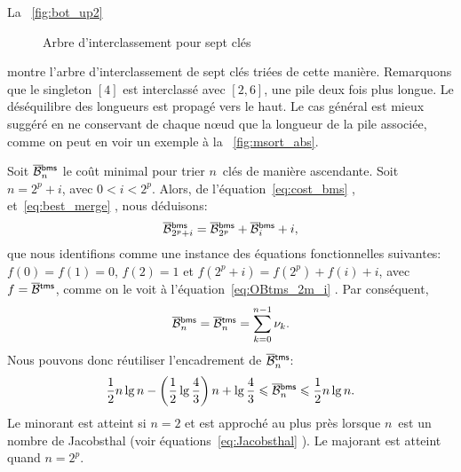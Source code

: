 La \fig~\vref{fig:bot_up2}
\begin{figure}[!b]
\centering
{}
\qquad
{}
\caption{Arbre d'interclassement pour sept clés}
\end{figure}
montre l'arbre d'interclassement
de sept clés triées de cette manière. Remarquons que le singleton
\([4]\) est interclassé avec \([2,6]\), une pile deux fois plus
longue. Le déséquilibre des longueurs est propagé vers le haut. Le cas
général est mieux suggéré en ne conservant de chaque n{\oe}ud que la
longueur de la pile associée, comme on peut en voir un exemple à la
\fig~\vref{fig:msort_abs}.


Soit \(\OB{\fun{bms}}{n}\) le coût
minimal pour trier \(n\)~clés de manière ascendante. Soit \(n=2^p+i\),
avec \(0 < i < 2^p\). Alors, de l'équation~\eqref{eq:cost_bms}
, et~\eqref{eq:best_merge}
, nous déduisons:
\begin{equation*}
\OB{\fun{bms}}{2^p+i} = \OB{\fun{bms}}{2^p} + \OB{\fun{bms}}{i} + i,
\end{equation*}
que nous identifions comme une instance des équations fonctionnelles
suivantes: \(f(0)=f(1)=0\), \(f(2)=1\) et \(f(2^p+i) = f(2^p) + f(i) +
i\), avec \(f=\OB{\fun{tms}}{}\), comme on le voit à
l'équation~\eqref{eq:OBtms_2m_i} . Par
conséquent,
\begin{equation}
\OB{\fun{bms}}{n} = \OB{\fun{tms}}{n} = \sum_{k=0}^{n-1}{\nu_k}.
\label{eq:OBbms}
\end{equation}
Nous pouvons donc réutiliser l'encadrement de \(\OB{\fun{tms}}{n}\):
\begin{equation}
\frac{1}{2}n\lg n - \left(\frac{1}{2}\lg\frac{4}{3}\right)n + \lg\frac{4}{3}
\leqslant \OB{\fun{bms}}{n} \leqslant
\frac{1}{2}n\lg n.
\index{bms@$\OB{\fun{bms}}{n}$}
\end{equation}
Le minorant est atteint si \(n=2\) et est approché au plus près
lorsque \(n\)~est un nombre de Jacobsthal (voir équations~\eqref{eq:Jacobsthal}
). Le majorant est atteint quand \(n=2^p\).


